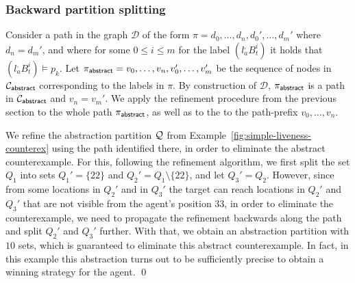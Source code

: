 \begin{theorem}
\end{theorem}

\subsubsection{Backward partition splitting}

Consider a path in the graph $\mathcal{D}$ of the form $\pi = d_0,\ldots, d_n,d_0',\ldots,d_m'$ where $d_n = d_m'$, and where for some $0 \leq i \leq m$ for the label $(l_a^,B_t^i)$ it holds that $(l_a^,B_t^i) \models p_k$. Let 
$\pi_{\mathsf{abstract}} = v_0,\ldots, v_n,v_0',\ldots,v_m'$ be the sequence of nodes in $\mathcal{C}_{\mathsf{abstract}}$ corresponding to the labels in $\pi$. By construction of $\mathcal D$, $\pi_{\mathsf{abstract}}$ is a path in $\mathcal{C}_{\mathsf{abstract}}$ and $v_n = v_m'$. We apply the refinement procedure from the previous section to the whole path $\pi_{\mathsf{abstract}}$, as well as to the to the path-prefix $v_0,\ldots, v_n$.

\begin{theorem}
\end{theorem}

\begin{example}\label{ex:simple-liveness-refinement}
We refine the abstraction partition $\mathcal{Q}$ from Example~\ref{fig:simple-liveness-counterex} using the path identified there, in order to eliminate the abstract counterexample. For this, following the refinement algorithm, we first split the set $Q_1$ into sets $Q_1' = \{22\}$ and $Q_2' = Q_1 \setminus \{22\}$, and let $Q_3' = Q_2$. However, since from some locations in $Q_2'$ and in $Q_3'$ the target can reach locations in $Q_2'$ and $Q_3'$ that are not visible from the agent's position $33$, in order to eliminate the counterexample, we need to propagate the refinement backwards along the path and split $Q_2'$ and $Q_3'$ further. With that, we obtain an abstraction partition with $10$ sets, which is guaranteed to eliminate this abstract counterexample. In fact, in this example this abstraction turns out to be sufficiently precise to obtain a winning strategy for the agent.
\qed
\end{example}
